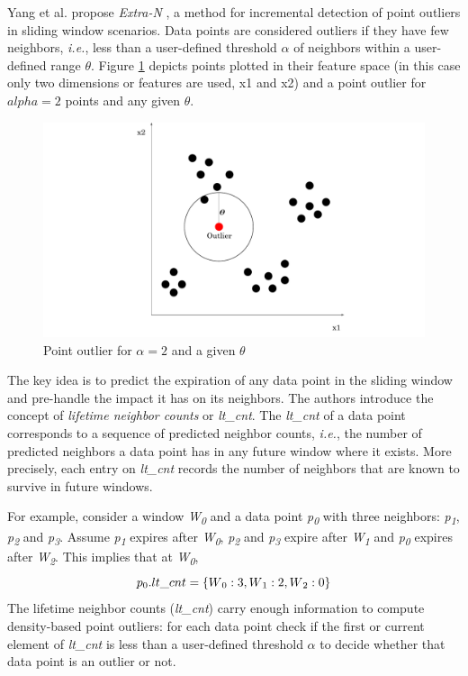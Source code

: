 Yang et al. propose \emph{Extra-N} \cite{Yang-Neighbor-Based-Pattern-Detection}, a method for incremental detection of point outliers in sliding window scenarios. Data points are considered outliers if they have few neighbors, \textit{i.e.}, less than a user-defined threshold $\alpha$ of neighbors within a user-defined range $\theta$. Figure \ref{fig:point-outlier} depicts points plotted in their feature space (in this case only two dimensions or features are used, x1 and x2) and a point outlier for $alpha=2$ points and any given $\theta$.
\begin{figure}[!htb]
  \begin{center}
    \includegraphics[scale=0.6]{figures/point-outlier.pdf}
    \caption{Point outlier for $\alpha=2$ and a given $\theta$}
    \label{fig:point-outlier}
  \end{center}
\end{figure}

The key idea is to predict the expiration of any data point in the sliding window and pre-handle the impact it has on its neighbors. The authors introduce the concept of \emph{lifetime neighbor counts} or \textit{lt\_cnt}. The \textit{lt\_cnt} of a data point corresponds to a sequence of predicted neighbor counts, \textit{i.e.}, the number of predicted neighbors a data point has in any future window where it exists. More precisely, each entry on \textit{lt\_cnt} records the number of neighbors that are known to survive in future windows. 

For example, consider a window \textit{W\textsubscript{0}} and a data point \textit{p\textsubscript{0}} with three neighbors: \textit{p\textsubscript{1}}, \textit{p\textsubscript{2}} and \textit{p\textsubscript{3}}. Assume \textit{p\textsubscript{1}} expires after \textit{W\textsubscript{0}}, \textit{p\textsubscript{2}} and \textit{p\textsubscript{3}} expire after \textit{W\textsubscript{1}} and \textit{p\textsubscript{0}} expires after \textit{W\textsubscript{2}}. This implies that at \textit{W\textsubscript{0}}, 
\[ p\textsubscript{0}.lt\_cnt = \{W\textsubscript{0}: 3, W\textsubscript{1}: 2, W\textsubscript{2}: 0\} \]
The lifetime neighbor counts (\textit{lt\_cnt}) carry enough information to compute density-based point outliers: for each data point check if the first or current element of \textit{lt\_cnt} is less than a user-defined threshold $\alpha$ to decide whether that data point is an outlier or not.


